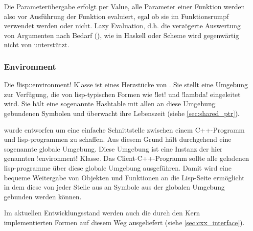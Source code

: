 Die Parameterübergabe erfolgt per Value, alle Parameter einer Funktion werden also vor Ausführung der Funktion evaluiert, egal ob sie im Funktionsrumpf verwendet werden oder nicht. Lazy Evaluation, d.h. die verzögerte Auswertung von Argumenten nach Bedarf (\cite[64]{wilhelm_uebersetzerbau_2007}), wie in Haskell oder Scheme wird gegenwärtig nicht von \projectname{} unterstützt.

\subsubsection*{Environment}

Die !lisp::environment! Klasse ist eines Herzstücke von \projectname{}.
Sie stellt eine Umgebung zur Verfügung, die von lisp-typischen Formen wie !let! und !lambda!
eingeleitet wird. Sie hält eine sogenannte Hashtable mit allen an diese Umgebung gebundenen
Symbolen und überwacht ihre Lebenszeit (siehe \ref{sec:shared_ptr}).

\projectname{} wurde entworfen um eine einfache Schnittstelle zwischen einem C++-Programm
und lisp-programmen zu schaffen. Aus diesem Grund hält \projectname{} durchgehend
eine sogenannte globale Umgebung. Diese Umgebung ist eine Instanz der hier genannten 
!environment! Klasse. Das Client-C++-Programm sollte alle geladenen lisp-programme
über diese globale Umgebung ausgeführen. Damit wird eine bequeme Weitergabe von Objekten
und Funktionen an die Lisp-Seite ermöglicht in dem diese von jeder Stelle aus an Symbole
aus der globalen Umgebung gebunden werden können.

Im aktuellen Entwicklungsstand werden auch die durch den Kern implementierten
Formen auf diesem Weg ausgeliefert (siehe \ref{sec:cxx_interface}).

